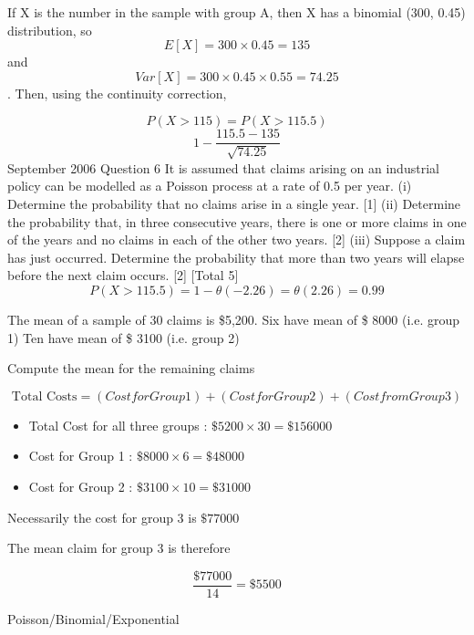 If X is the number in the sample with group A, then X has a binomial (300, 0.45)
distribution, so
\[ E[X] = 300 \times 0.45 = 135 \] and 
\[ Var[X] = 300 \times 0.45 \times 0.55 = 74.25 \].
Then, using the continuity correction,

\[ P(X > 115) = P(X > 115.5)\]
\[ 1- \frac{115.5 - 135}{\sqrt{74.25} } \]
September 2006 Question 6
It is assumed that claims arising on an industrial policy can be modelled as a Poisson
process at a rate of 0.5 per year.
(i) Determine the probability that no claims arise in a single year. [1]
(ii) Determine the probability that, in three consecutive years, there is one or more
claims in one of the years and no claims in each of the other two years. [2]
(iii) Suppose a claim has just occurred. Determine the probability that more than
two years will elapse before the next claim occurs. [2]
[Total 5]
\[  P(X > 115.5) = 1 -\theta(-2.26) = \theta(2.26) = 0.99\]

The mean of a sample of 30 claims is \$5,200.
Six have mean of \$ 8000 (i.e. group 1)
Ten have mean of \$ 3100 (i.e. group 2)

Compute the mean for the remaining claims

\[\mbox{Total Costs} = (Cost for Group 1) + (Cost for Group 2) + (Cost from Group 3)\]

\begin{itemize}
\item Total Cost for all three groups : $\$5200 \times 30 = \$156000$
\item Cost for Group 1 : $\$8000 \times 6 = \$48000$
\item Cost for Group 2 : $\$3100 \times 10 = \$31000$
\end{itemize}

Necessarily the cost for group 3 is $\$77000$

The mean claim for group 3 is therefore

\[ \frac{\$77000}{14} = \$5500 \]


Poisson/Binomial/Exponential

